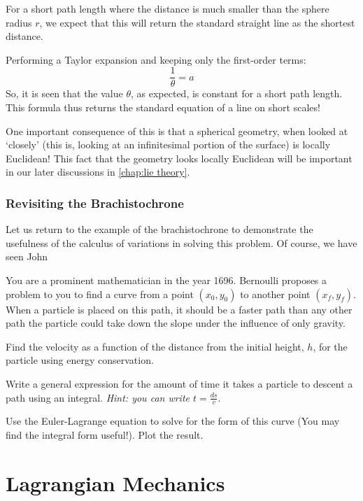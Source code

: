 \begin{example}
For a short path length where the distance is much smaller than the sphere radius $r$, we expect that this will return the standard straight line as the shortest distance.

Performing a Taylor expansion and keeping only the first-order terms:
$$\frac{1}{\theta}=a$$
So, it is seen that the value $\theta$, as expected, is constant for a short path length. This formula thus returns the standard equation of a line on short scales!

One important consequence of this is that a spherical geometry, when looked at `closely' (this is, looking at an infinitesimal portion of the surface) is locally Euclidean! This fact that the geometry looks locally Euclidean will be important in our later discussions in \autoref{chap:lie theory}.
\end{example}
 
\subsection{Revisiting the Brachistochrone}

\begin{example}[Brachistochrone]\label{ex:brachistrochrone}
    Let us return to the example of the \gls{brachistochrone} to demonstrate the usefulness of the calculus of variations in solving  this problem. Of course, we have seen John

You are a prominent mathematician in the year 1696. Bernoulli proposes a problem to you to find a curve from a point $(x_0,y_0)$ to another point $\left(x_f,y_f\right)$. When a particle is placed on this path, it should be a faster path than any other path the particle could take down the slope under the influence of only gravity.

Find the velocity as a function of the distance from the initial height, $h$, for the particle using energy conservation.

Write a general expression for the amount of time it takes a particle to descent a path using an integral. \textit{Hint: you can write $t=\frac{ds}{v}$}.

Use the Euler-Lagrange equation to solve for the form of this curve (You may find the integral form useful!). Plot the result.
\end{example}

\chapter{Lagrangian Mechanics}\label{chap:lagrangian}

